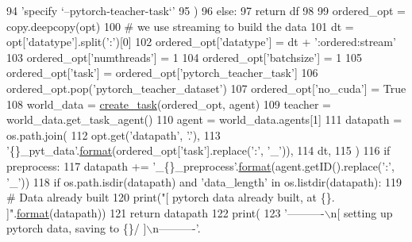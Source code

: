 \begin{DoxyCode}
94                 \textcolor{stringliteral}{'specify `--pytorch-teacher-task`'}
95             )
96         \textcolor{keywordflow}{else}:
97             \textcolor{keywordflow}{return} df
98 
99     ordered\_opt = copy.deepcopy(opt)
100     \textcolor{comment}{# we use streaming to build the data}
101     dt = opt[\textcolor{stringliteral}{'datatype'}].split(\textcolor{stringliteral}{':'})[0]
102     ordered\_opt[\textcolor{stringliteral}{'datatype'}] = dt + \textcolor{stringliteral}{':ordered:stream'}
103     ordered\_opt[\textcolor{stringliteral}{'numthreads'}] = 1
104     ordered\_opt[\textcolor{stringliteral}{'batchsize'}] = 1
105     ordered\_opt[\textcolor{stringliteral}{'task'}] = ordered\_opt[\textcolor{stringliteral}{'pytorch\_teacher\_task'}]
106     ordered\_opt.pop(\textcolor{stringliteral}{'pytorch\_teacher\_dataset'})
107     ordered\_opt[\textcolor{stringliteral}{'no\_cuda'}] = \textcolor{keyword}{True}
108     world\_data = \hyperlink{namespaceparlai_1_1core_1_1worlds_a79969c7ba76d4b3c500f5bb776444dc6}{create\_task}(ordered\_opt, agent)
109     teacher = world\_data.get\_task\_agent()
110     agent = world\_data.agents[1]
111     datapath = os.path.join(
112         opt.get(\textcolor{stringliteral}{'datapath'}, \textcolor{stringliteral}{'.'}),
113         \textcolor{stringliteral}{'\{\}\_pyt\_data'}.\hyperlink{namespaceparlai_1_1chat__service_1_1services_1_1messenger_1_1shared__utils_a32e2e2022b824fbaf80c747160b52a76}{format}(ordered\_opt[\textcolor{stringliteral}{'task'}].replace(\textcolor{stringliteral}{':'}, \textcolor{stringliteral}{'\_'})),
114         dt,
115     )
116     \textcolor{keywordflow}{if} preprocess:
117         datapath += \textcolor{stringliteral}{'\_\{\}\_preprocess'}.\hyperlink{namespaceparlai_1_1chat__service_1_1services_1_1messenger_1_1shared__utils_a32e2e2022b824fbaf80c747160b52a76}{format}(agent.getID().replace(\textcolor{stringliteral}{':'}, \textcolor{stringliteral}{'\_'}))
118     \textcolor{keywordflow}{if} os.path.isdir(datapath) \textcolor{keywordflow}{and} \textcolor{stringliteral}{'data\_length'} \textcolor{keywordflow}{in} os.listdir(datapath):
119         \textcolor{comment}{# Data already built}
120         print(\textcolor{stringliteral}{"[ pytorch data already built, at \{\}. ]"}.\hyperlink{namespaceparlai_1_1chat__service_1_1services_1_1messenger_1_1shared__utils_a32e2e2022b824fbaf80c747160b52a76}{format}(datapath))
121         \textcolor{keywordflow}{return} datapath
122     print(
123         \textcolor{stringliteral}{'----------\(\backslash\)n[ setting up pytorch data, saving to \{\}/ ]\(\backslash\)n----------'}.

\end{DoxyCode}
